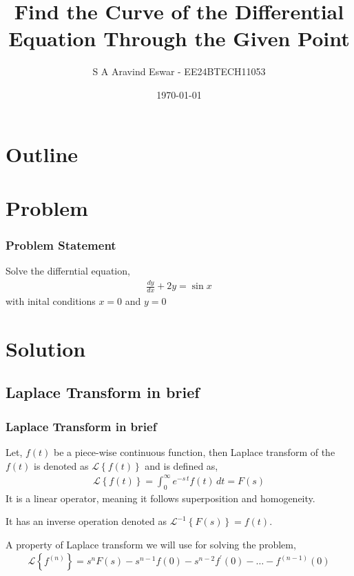 \documentclass{beamer}
\title{Find the Curve of the Differential Equation Through the Given Point}
\author{S A Aravind Eswar - EE24BTECH11053}
\date{\today}
\providecommand{\cbrak}[1]{\ensuremath{\left\{#1\right\}}}
\theoremstyle{remark}
\numberwithin{equation}{section}
\begin{document}
\begin{frame}
\titlepage
\end{frame}

\section*{Outline}
\begin{frame}
\tableofcontents
\end{frame}

\section{Problem}
\begin{frame}
\frametitle{Problem Statement}
    Solve the differntial equation,
    \begin{align}
        \frac{dy}{dx} + 2y = \sin{x}
    \end{align}
    with inital conditions $x=0$ and $y=0$
\end{frame}

\section{Solution}

\subsection{Laplace Transform in brief}
\begin{frame}
    \frametitle{Laplace Transform in brief}
    Let, $f(t)$ be a piece-wise continuous function, then Laplace transform of the $f(t)$ is denoted as $\mathcal{L}\cbrak{f(t)}$ and is defined as,
    \begin{align}
        \mathcal{L}\cbrak{f(t)} = \int_{0}^{\infty} e^{-s\,t}f(t)\,dt = F(s)
    \end{align}
    It is a linear operator, meaning it follows superposition and homogeneity.

    It has an inverse operation denoted as $\mathcal{L}^{-1}\cbrak{F(s)} = f(t)$.

    A property of Laplace transform we will use for solving the problem,
    \begin{align}
        \mathcal{L}\cbrak{f^{(n)}} = s^n F(s) - s^{n-1} f(0) - s^{n-2} f^\prime(0) - \dots - f^{(n-1)}(0) 
    \end{align}
\end{frame}
\end{document}
